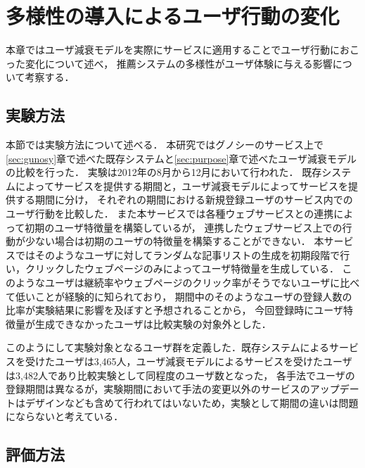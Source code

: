 \documentclass[japanese]{jnlp_1.4}
\begin{document}
\section{多様性の導入によるユーザ行動の変化}
\label{sec:experience}

本章ではユーザ減衰モデルを実際にサービスに適用することでユーザ行動におこった変化について述べ，
推薦システムの多様性がユーザ体験に与える影響について考察する．


\subsection{実験方法}

本節では実験方法について述べる．
本研究ではグノシーのサービス上で\ref{sec:gunosy}章で述べた既存システムと\ref{sec:purpose}章で述べたユーザ減衰モデルの比較を行った．
実験は2012年の8月から12月において行われた．
既存システムによってサービスを提供する期間と，ユーザ減衰モデルによってサービスを提供する期間に分け，
それぞれの期間における新規登録ユーザのサービス内でのユーザ行動を比較した．
また本サービスでは各種ウェブサービスとの連携によって初期のユーザ特徴量を構築しているが，
連携したウェブサービス上での行動が少ない場合は初期のユーザの特徴量を構築することができない．
本サービスではそのようなユーザに対してランダムな記事リストの生成を初期段階で行い，クリックしたウェブページのみによってユーザ特徴量を生成している．
このようなユーザは継続率やウェブページのクリック率がそうでないユーザに比べて低いことが経験的に知られており，
期間中のそのようなユーザの登録人数の比率が実験結果に影響を及ぼすと予想されることから，
今回登録時にユーザ特徴量が生成できなかったユーザは比較実験の対象外とした．

このようにして実験対象となるユーザ群を定義した．既存システムによるサービスを受けたユーザは3,465人，ユーザ減衰モデルによるサービスを受けたユーザは3,482人であり比較実験として同程度のユーザ数となった，
各手法でユーザの登録期間は異なるが，実験期間において手法の変更以外のサービスのアップデートはデザインなども含めて行われてはいないため，実験として期間の違いは問題にならないと考えている．


\subsection{評価方法}
\end{document}

